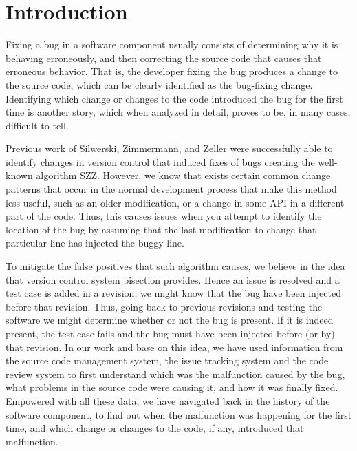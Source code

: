 \documentclass[10pt, conference]{IEEEtran}
\begin{document}
\section{Introduction}
\label{sec:intro}

Fixing a bug in a software component usually consists of determining why it is behaving erroneously, and then correcting the source code that causes that erroneous behavior. That is, the developer fixing the bug produces a change to the source code, which can be clearly identified as the bug-fixing change. Identifying which change or changes to the code introduced the bug for the first time is another story, which when analyzed in detail, proves to be, in many cases, difficult to tell.

Previous work of Silwerski, Zimmermann, and Zeller were successfully able to identify changes in version control that induced fixes of bugs creating the well-known algorithm SZZ\cite{sliwerski2005changes}. However, we know that exists certain common change patterns that occur in the normal development process that make this method less useful, such as an older modification, or a change in some API in a different part of the code. Thus, this causes issues when you attempt to identify the location of the bug by assuming that the last modification to change that particular line has injected the buggy line.

To mitigate the false positives that such algorithm causes, we believe in the idea that version control system bisection provides. Hence an issue is resolved and a test case is added in a revision, we might know that the bug have been injected before that revision. Thus, going back to previous revisions and testing the software we might determine whether or not the bug is present. If it is indeed present, the test case fails and the bug must have been injected before (or by) that revision. In our work and base on this idea, we have used information from the source code management system, the issue tracking system and the code review system to first understand which was the malfunction caused by the bug, what problems in the source code were causing it, and how it was finally fixed. Empowered with all these data, we have navigated back in the history of the software component, to find out when the malfunction was happening for the first time, and which change or changes to the code, if any, introduced that malfunction.
\end{document}
